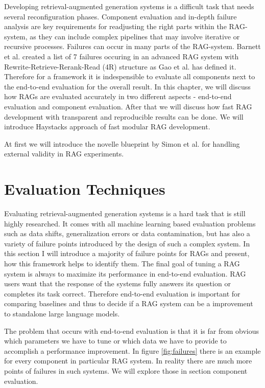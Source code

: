 
Developing retrieval-augmented generation systems is a difficult task that needs several reconfiguration phases.\cite{Simon.10112024} Component evaluation and in-depth failure analysis are key requirements for readjusting the right parts within the RAG-system, as they can include complex pipelines that may involve iterative or recursive processes. Failures can occur in many parts of the RAG-system. Barnett et al.\cite{Barnett.2024} created a list of 7 failures occuring in an advanced RAG system with Rewrite-Retrieve-Rerank-Read (4R) structure as Gao et al.\cite{Gao.18.12.2023} has defined it. Therefore for a framework it is indespensible to evaluate all components next to the end-to-end evaluation for the overall result. In this chapter, we will discuss how RAGs are evaluated accurately in two different aspects - end-to-end evaluation and component evaluation. After that we will discuss how fast RAG development with transparent and reproducible results can be done. We will introduce Haystacks approach of fast modular RAG development. 

At first we will introduce the novelle blueprint by Simon et al.\cite{Simon.10112024} for handling external validity in RAG experiments. 

\section{Evaluation Techniques}

Evaluating retrieval-augmented generation systems is a hard task that is still highly researched. It comes with all machine learning based evaluation problems such as data shifts, generalization errors or data contamination, but has also a variety of failure points introduced by the design of such a complex system. In this section I will introduce a majority of failure points for RAGs and present, how this framework helps to identify them. The final goal of tuning a RAG system is always to maximize its performance in end-to-end evaluation. RAG users want that the response of the systems fully answers its question or completes its task correct. Therefore end-to-end evaluation is important for comparing baselines and thus to decide if a RAG system can be a improvement to standalone large language models. 


The problem that occurs with end-to-end evaluation is that it is far from obvious which parameters we have to tune or which data we have to provide to accomplish a performance improvement. In figure \ref{fig:failures} there is an example for every component in particular RAG system. In reality there are much more points of failures in such systems. We will explore those in section component evaluation.

